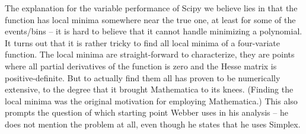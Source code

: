 \documentclass[twoside,english]{uiofysmaster}
\begin{document}
The explanation for the variable performance of Scipy we believe lies in that the function has local minima somewhere near the true one, at least for some of the events/bins -- it is hard to believe that it cannot handle minimizing a polynomial. It turns out that it is rather tricky to find all local minima of a four-variate function. The local minima are straight-forward to characterize, they are points where all partial derivatives of the function is zero and the Hesse matrix is positive-definite. But to actually find them all has proven to be numerically extensive, to the degree that it brought Mathematica to its knees. (Finding the local minima was the original motivation for employing Mathematica.) This also prompts the question of which starting point Webber uses in his analysis -- he does not mention the problem at all, even though he states that he uses Simplex.
\end{document}
